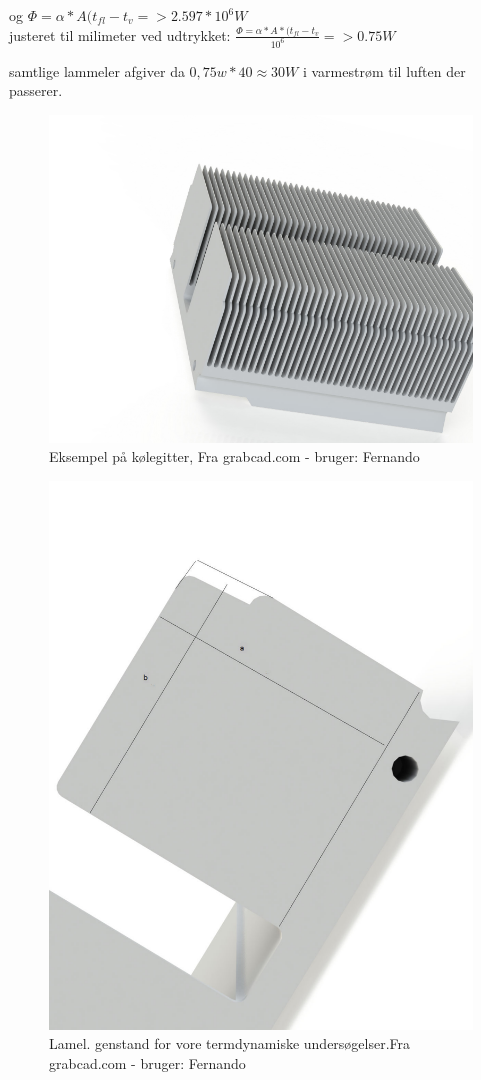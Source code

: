 
og $ \Phi = \alpha*A(t_{fl}-t_v =>2.597*10^6 W $\\ 
justeret til milimeter ved udtrykket: $\frac{\Phi = \alpha*A*(t_{fl}-t_v}{10^6} =>0.75 W$

samtlige lammeler afgiver da $0,75 w* 40 \approx 30 W$ i varmestrøm til luften der passerer. 

\begin{figure}
	\centering
	\includegraphics[width=0.7\linewidth]{billeder/heatsink1}
	\caption{Eksempel på kølegitter, Fra grabcad.com - bruger: Fernando}
	\label{fig:heatsink1}
\end{figure}


\begin{figure}
	\centering
	\includegraphics[width=0.7\linewidth]{billeder/lamel}
	\caption{Lamel. genstand for vore termdynamiske undersøgelser.Fra grabcad.com - bruger: Fernando}
	\label{fig:lamel}
\end{figure}
